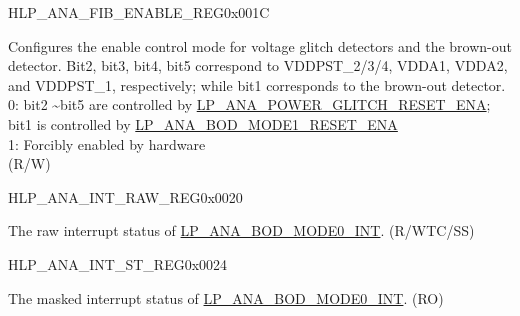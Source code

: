 \begin{register}{H}{LP\_ANA\_FIB\_ENABLE\_REG}{0x001C}\label{regdesc:LPANAFIBENABLEREG}
%
\regnewline%
\begin{regdesc}\begin{reglist}
\label{fielddesc:LPANAANAFIBENA}\item [LP\_ANA\_ANA\_FIB\_ENA]  Configures the enable control mode for voltage glitch detectors and the brown-out detector. Bit2, bit3, bit4, bit5 correspond to VDDPST\_2/3/4, VDDA1, VDDA2, and VDDPST\_1, respectively; while bit1 corresponds to the brown-out detector.\\
0: bit2 \textasciitilde bit5 are controlled by \hyperref[fielddesc:LPANAPOWERGLITCHRESETENA]{LP\_ANA\_POWER\_GLITCH\_RESET\_ENA}; bit1 is controlled by \hyperref[fielddesc:LPANABODMODE1RESETENA]{LP\_ANA\_BOD\_MODE1\_RESET\_ENA} \\
1: Forcibly enabled by hardware\\
(R/W)
\end{reglist}\end{regdesc}
\end{register}


\begin{register}{H}{LP\_ANA\_INT\_RAW\_REG}{0x0020}\label{regdesc:LPANAINTRAWREG}
%
%
\regnewline%
\begin{regdesc}\begin{reglist}
\label{fielddesc:LPANABODMODE0INTRAW}\item [LP\_ANA\_BOD\_MODE0\_INT\_RAW] The raw interrupt status of \hyperref[int:LPANABODMODE0INT]{LP\_ANA\_BOD\_MODE0\_INT}. (R/WTC/SS)
\end{reglist}\end{regdesc}
\end{register}

\begin{register}{H}{LP\_ANA\_INT\_ST\_REG}{0x0024}\label{regdesc:LPANAINTSTREG}
%
%
\regnewline%
\begin{regdesc}\begin{reglist}
\label{fielddesc:LPANABODMODE0INTST}\item [LP\_ANA\_BOD\_MODE0\_INT\_ST] The masked interrupt status of \hyperref[int:LPANABODMODE0INT]{LP\_ANA\_BOD\_MODE0\_INT}. (RO)
\end{reglist}\end{regdesc}
\end{register}

